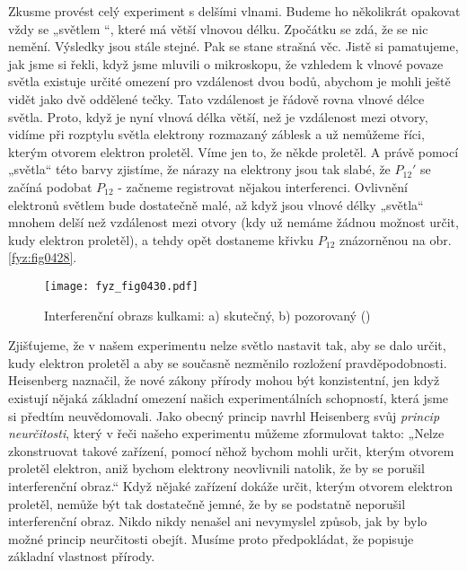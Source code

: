     Zkusme provést celý experiment s delšími vlnami. Budeme ho několikrát opakovat vždy se „světlem
    “, které má větší vlnovou délku. Zpočátku se zdá, že se nic nemění. Výsledky jsou stále stejné.
    Pak se stane strašná věc. Jistě si pamatujeme, jak jsme si řekli, když jsme mluvili o
    mikroskopu, že vzhledem k vlnové povaze světla existuje určité omezení pro vzdálenost dvou bodů,
    abychom je mohli ještě vidět jako dvě oddělené tečky. Tato vzdálenost je řádově rovna vlnové
    délce světla. Proto, když je nyní vlnová délka větší, než je vzdálenost mezi otvory, vidíme při
    rozptylu světla elektrony rozmazaný záblesk a už nemůžeme říci, kterým otvorem elektron
    proletěl. Víme jen to, že někde proletěl. A právě pomocí „světla“ této barvy zjistíme, že nárazy
    na elektrony jsou tak slabé, že \(P_{12}'\) se začíná podobat \(P_{12}\) - začneme registrovat
    nějakou interferenci. Ovlivnění elektronů světlem bude dostatečně malé, až když jsou vlnové
    délky „světla“ mnohem delší než vzdálenost mezi otvory (kdy už nemáme žádnou možnost určit, kudy
    elektron proletěl), a tehdy opět dostaneme křivku \(P_{12}\) znázorněnou na obr.
    \ref{fyz:fig0428}.

    \begin{figure}[ht!] %
      \centering
      \texttt{[image: fyz\_fig0430.pdf]}
      \caption{Interferenční obrazs kulkami: a) skutečný, b) pozorovaný (\cite[s.~697]{Feynman01})}
      \label{fyz:fig0430}
    \end{figure}

    Zjišťujeme, že v našem experimentu nelze světlo nastavit tak, aby se dalo určit, kudy elektron
    proletěl a aby se současně nezměnilo rozložení pravděpodobnosti. Heisenberg naznačil, že nové
    zákony přírody mohou být konzistentní, jen když existují nějaká základní omezení našich
    experimentálních schopností, která jsme si předtím neuvědomovali. Jako obecný princip navrhl
    Heisenberg svůj \emph{princip neurčitosti}, který v řeči našeho experimentu můžeme zformulovat
    takto: „Nelze zkonstruovat takové zařízení, pomocí něhož bychom mohli určit, kterým otvorem
    proletěl elektron, aniž bychom elektrony neovlivnili natolik, že by se porušil interferenční
    obraz.“ Když nějaké zařízení dokáže určit, kterým otvorem elektron proletěl, nemůže být tak
    dostatečně jemné, že by se podstatně neporušil interferenční obraz. Nikdo nikdy nenašel ani
    nevymyslel způsob, jak by bylo možné princip neurčitosti obejít. Musíme proto předpokládat, že
    popisuje základní vlastnost přírody.
    
